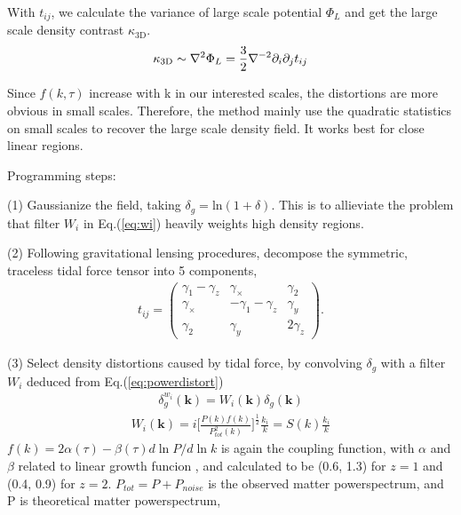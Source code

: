 With $t_{ij}$, we calculate the variance of large scale potential $\Phi_L$  
and get the large scale density contrast $\kappa_\mathrm{3D}$.
\begin{eqnarray}
    \label{eq:largepoten}
    \kappa_\mathrm{3D}\sim\nabla^2\Phi_L=\frac{3}{2}\nabla^{-2}\partial_i\partial_j t_{ij}
\end{eqnarray}

Since $f(k,\tau)$ increase with k in our interested scales, 
the distortions are more obvious in small scales. 
Therefore, the method mainly use the quadratic statistics on small scales to recover the large scale density field. 
It works best for close linear regions.


Programming steps:\noindent

(1) Gaussianize the field, taking 
$\delta_g=\mathrm{ln}(1+\delta)$. 
This is to allieviate the problem that filter $W_i$ in Eq.(\ref{eq:wi}) heavily weights high density regions.

(2) Following gravitational lensing procedures, decompose the symmetric, traceless tidal force tensor into 5 components, 
\begin{eqnarray}
t_{ij}=\left( \begin{array}{ccc}
\gamma_{1}-\gamma_{z} & \gamma_{\times} & \gamma_{2}\\
\gamma_{\times} & -\gamma_{1}-\gamma_{z} & \gamma_{y}\\
\gamma_{2} & \gamma_{y} & 2\gamma_z
\end{array} \right).
\end{eqnarray}

(3) Select density distortions caused by tidal force, 
by convolving $\delta_g$ with a filter $W_i$ 
deduced from Eq.(\ref{eq:powerdistort}) 
\begin{eqnarray}
\delta^{w_i}_g(\bm{k})=W_i(\bm{k})\delta_g(\bm{k}) 
\end{eqnarray}
\begin{eqnarray}
\label{eq:wi}
W_i(\bm{k})=i \bigg[\frac{P(k)f(k)}{P_{tot}^2(k)}\bigg]^{\frac{1}{2}}\frac{k_i}{k}
=S(k)\frac{k_i}{k}\nonumber
\end{eqnarray}
$f(k)=2\alpha(\tau)-\beta(\tau)d\ln P/d\ln k$ is again the coupling function, 
with $\alpha$ and $\beta$ related to linear growth funcion \cite{2015:zhu}, 
and calculated to be (0.6, 1.3) for $z=1$ and (0.4, 0.9) for $z=2$.
$P_{tot}=P+P_{noise}$ is the observed matter powerspectrum, 
and P is theoretical matter powerspectrum,

